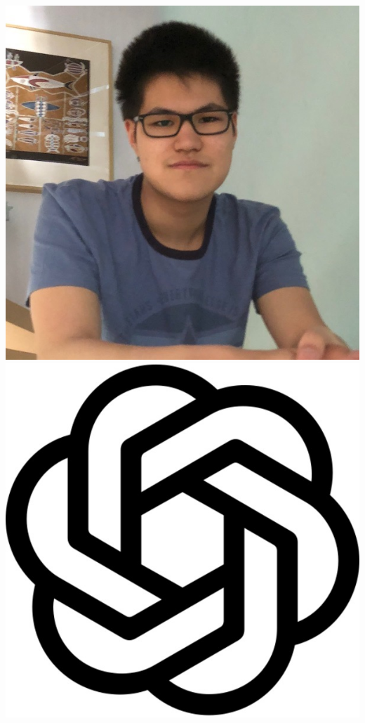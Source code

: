 \documentclass[aspectratio=169]{beamer}
\begin{document}
\begin{frame}
{        \includegraphics[width=0.06\textheight]{people/namu_kroupa.jpg}%
        \includegraphics[width=0.06\textheight]{people/openai.jpg}%
}
\end{frame}
\end{document}
